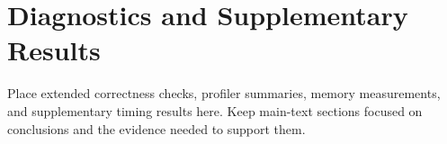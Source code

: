 \section{Diagnostics and Supplementary Results}
\label{app:diagnostics}

Place extended correctness checks, profiler summaries, memory measurements, and supplementary timing results here. Keep main-text sections focused on conclusions and the evidence needed to support them.
